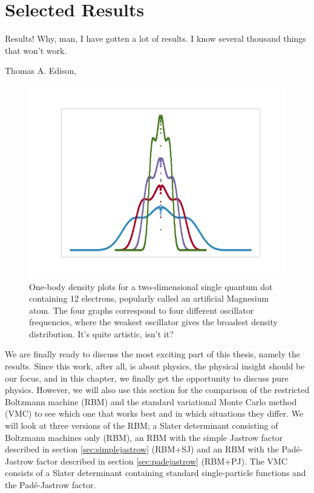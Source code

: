 \chapter{Selected Results} \label{chp:results}
\epigraph{Results! Why, man, I have gotten a lot of results. I know several thousand things that won't work.}{Thomas A. Edison, \cite{noauthor_edisonian_nodate}}
\begin{figure}[H]
	\centering
	\includegraphics[scale=0.6]{Images/art_white.png}
	\caption{One-body density plots for a two-dimensional single quantum dot containing 12 electrons, popularly called an artificial Magnesium atom. The four graphs correspond to four different oscillator frequencies, where the weakest oscillator gives the broadest density distribution. It's quite artistic, isn't it?}
\end{figure}

We are finally ready to discuss the most exciting part of this thesis, namely the results. Since this work, after all, is about physics, the physical insight should be our focus, and in this chapter, we finally get the opportunity to discuss pure physics. However, we will also use this section for the comparison of the restricted Boltzmann machine (RBM) and the standard variational Monte Carlo method (VMC) to see which one that works best and in which situations they differ. We will look at three versions of the RBM; a Slater determinant consisting of Boltzmann machines only (RBM), an RBM with the simple Jastrow factor described in section \ref{sec:simplejastrow} (RBM+SJ) and an RBM with the Padé-Jastrow factor described in section \ref{sec:padejastrow} (RBM+PJ). The VMC consists of a Slater determinant containing standard single-particle functions and the Padé-Jastrow factor. 

